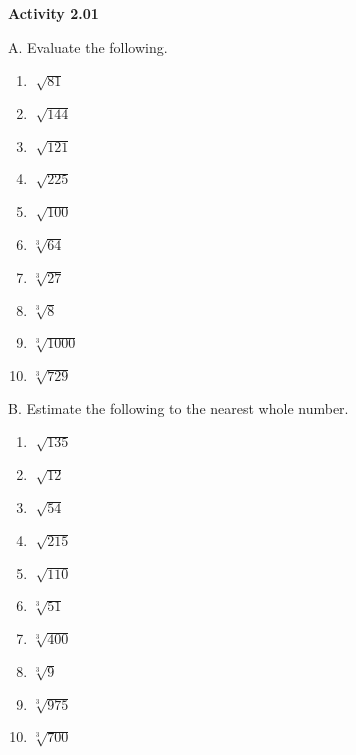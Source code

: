 \vspace{0.3ex}
\noindent\textbf{Activity 2.01}

\vspace{0.2ex}

A. Evaluate the following.
\begin{multicols}{4}
\begin{enumerate}[noitemsep, label = \color{blue}\arabic*. ]
\item \(\sqrt[]{81}\)
\item \(\sqrt[]{144}\)
\item \(\sqrt[]{121}\)
\item \(\sqrt[]{225}\)
\item \(\sqrt[]{100}\)
\item \(\sqrt[{\scriptstyle 3}]{64}\)
\item \(\sqrt[{\scriptstyle 3}]{27}\)
\item \(\sqrt[{\scriptstyle 3}]{8}\)
\item \(\sqrt[{\scriptstyle 3}]{1000}\)
\item \(\sqrt[{\scriptstyle 3}]{729}\)
\end{enumerate}
\end{multicols}

B. Estimate the following to the nearest whole number.
\begin{multicols}{4}
\begin{enumerate}[noitemsep, label = \color{blue}\arabic*. ]
\item \(\sqrt[]{135}\)
\item \(\sqrt[]{12}\)
\item \(\sqrt[]{54}\)
\item \(\sqrt[]{215}\)
\item \(\sqrt[]{110}\)
\item \(\sqrt[{\scriptstyle 3}]{51}\)
\item \(\sqrt[{\scriptstyle 3}]{400}\)
\item \(\sqrt[{\scriptstyle 3}]{9}\)
\item \(\sqrt[{\scriptstyle 3}]{975}\)
\item \(\sqrt[{\scriptstyle 3}]{700}\)
\end{enumerate}
\end{multicols}
